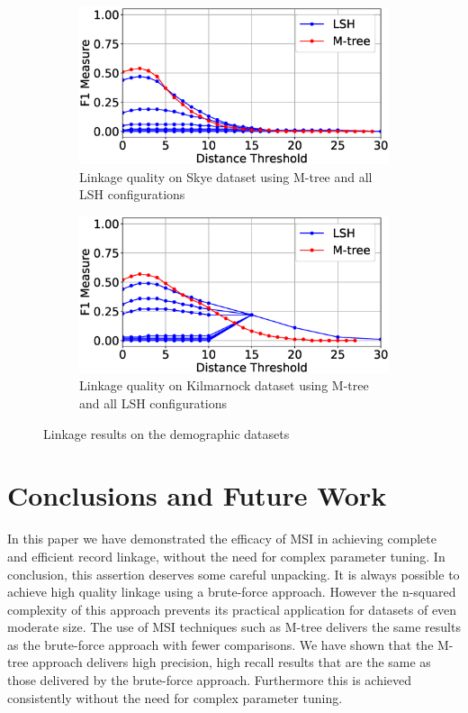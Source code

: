 \documentclass{llncs}
\begin{document}
\begin{figure}
\begin{subfigure}{.5\textwidth}
  \centering
\includegraphics[width=\textwidth]{figures/plotFs-skye-f}
\caption{Linkage quality on Skye dataset using M-tree and all LSH configurations}
\end{subfigure}%
\begin{subfigure}{.5\textwidth}
  \centering
\includegraphics[width=\textwidth]{figures/plotFs-kilmarnock-f}
\caption{Linkage quality on Kilmarnock dataset using M-tree and all LSH configurations}
\end{subfigure}

\caption{Linkage results on the demographic datasets}
\label{demography-quality-mtree}
\end{figure}


\section{Conclusions and Future Work\label{sec-concl}}

In this paper we have demonstrated the efficacy of MSI in achieving  complete and efficient record linkage, without the need for complex parameter tuning. In conclusion, this assertion deserves some careful unpacking. It is always possible to achieve high quality linkage using a brute-force approach. However the n-squared complexity of this approach prevents its practical application for datasets of even moderate size. The use of MSI techniques such as M-tree delivers the same results as the brute-force approach with fewer comparisons. We have shown that the M-tree approach delivers high precision, high recall results that are the same as those delivered by the brute-force approach. Furthermore this is achieved consistently without the need for complex parameter tuning.
\end{document}
